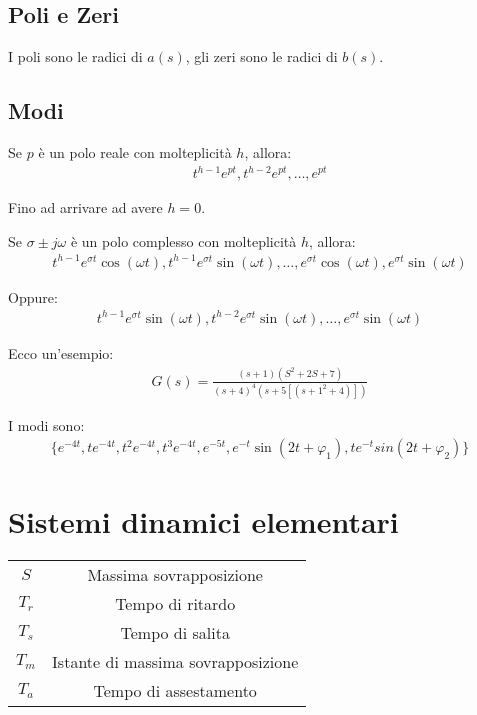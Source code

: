 \documentclass{article}
\begin{document}
\subsection{Poli e Zeri}
I poli sono le radici di $a(s)$, gli zeri sono le radici di $b(s)$.


\subsection{Modi}
Se $p$ \`e un polo reale con molteplicit\`a $h$, allora:
\begin{align}
  t^{h-1} e^{pt}, t^{h-2} e^{pt}, \dots, e^{pt}
\end{align}

Fino ad arrivare ad avere $h = 0$.

Se $\sigma \pm j \omega$ \`e un polo complesso con molteplicit\`a $h$, allora:
\begin{align}
  t^{h-1} e^{\sigma t} \cos(\omega t), t^{h-1} e^{\sigma t} \sin(\omega t), \dots, e^{\sigma t} \cos(\omega t), e^{\sigma t} \sin(\omega t)
\end{align}

Oppure:
\begin{align}
  t^{h-1} e^{\sigma t} \sin(\omega t), t^{h-2} e^{\sigma t} \sin(\omega t), \dots, e^{\sigma t} \sin(\omega t)
\end{align}



Ecco un'esempio:
\begin{align}
  G(s) = \frac{(s+1)(S^2 + 2S + 7)}{(s+4)^4(s+5[(s+1^2 +4)])}
\end{align}


I modi sono:
\begin{align}
  \Big\{
    e^{-4t}, te^{-4t}, t^2e^{-4t}, t^3e^{-4t}, 
    e^{-5t},
    e^{-t} \sin(2t + \varphi_1) , t e^{-t} sin(2t + \varphi_2)
    \Big\}
\end{align}

\section{Sistemi dinamici elementari}

\begin{center}
  \begin{tabular}{| c | c |}
    \hline
    $S$ & Massima sovrapposizione \\
    $T_r$ & Tempo di ritardo \\
    $T_s$ & Tempo di salita \\
    $T_m$ & Istante di massima sovrapposizione \\
    $T_a$ & Tempo di assestamento \\
    \hline
  \end{tabular}
\end{center}
\end{document}
